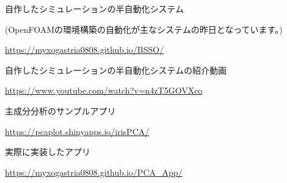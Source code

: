 \documentclass[dvipdfmx,uplatex]{jsarticle}
\begin{document}
  \begin{spacing}{1.4}
    \centerline{\large 自作したシミュレーションの半自動化システム\\}
    \centerline{(OpenFOAMの環境構築の自動化が主なシステムの昨日となっています。)\\}
  \end{spacing}
  \centerline{\url{https://myxogastria0808.github.io/BSSO/}}
  \begin{spacing}{1.4}
    \centerline{\large 自作したシミュレーションの半自動化システムの紹介動画\\}
    \centerline{\url{https://www.youtube.com/watch?v=n4zT5GOVXco}}
  \end{spacing}
  \begin{spacing}{1.4}
    \centerline{\large 主成分分析のサンプルアプリ\\}
    \centerline{\url{https://pcaplot.shinyapps.io/irisPCA/}}
  \end{spacing}
  \begin{spacing}{1.4}
    \centerline{\large 実際に実装したアプリ\\}
    \centerline{\url{https://myxogastria0808.github.io/PCA_App/}}
  \end{spacing}
\end{document}
